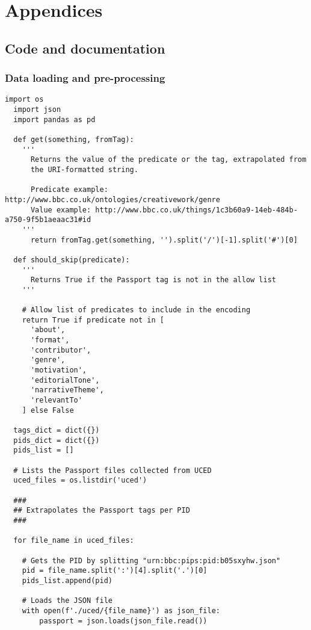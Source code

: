 \section{Appendices}

\subsection{Code and documentation}

\subsubsection{Data loading and pre-processing}

\begin{lstlisting}[caption={Passport tags loading},label={lst:data_loading}]
  import os
  import json
  import pandas as pd

  def get(something, fromTag):
    '''
      Returns the value of the predicate or the tag, extrapolated from
      the URI-formatted string.

      Predicate example: http://www.bbc.co.uk/ontologies/creativework/genre
      Value example: http://www.bbc.co.uk/things/1c3b60a9-14eb-484b-a750-9f5b1aeaac31#id
    '''
      return fromTag.get(something, '').split('/')[-1].split('#')[0]

  def should_skip(predicate):
    '''
      Returns True if the Passport tag is not in the allow list
    '''

    # Allow list of predicates to include in the encoding
    return True if predicate not in [
      'about',
      'format',
      'contributor',
      'genre',
      'motivation',
      'editorialTone',
      'narrativeTheme',
      'relevantTo'
    ] else False

  tags_dict = dict({})
  pids_dict = dict({})
  pids_list = []

  # Lists the Passport files collected from UCED
  uced_files = os.listdir('uced')

  ###
  ## Extrapolates the Passport tags per PID
  ###

  for file_name in uced_files:

    # Gets the PID by splitting "urn:bbc:pips:pid:b05sxyhw.json"
    pid = file_name.split(':')[4].split('.')[0]
    pids_list.append(pid)

    # Loads the JSON file
    with open(f'./uced/{file_name}') as json_file:
        passport = json.loads(json_file.read())


\end{lstlisting}
